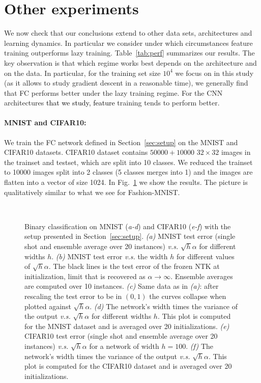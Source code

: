 \documentclass{article}
\newcommand{\mm}[1]{\textcolor{black}{#1}}
\newcommand{\sref}[1]{Section~\ref{#1}}
\newcommand{\fref}[1]{Fig.~\ref{#1}}
\begin{document}
\section{Other experiments}
\label{sec:other_setups}

We now check that our conclusions extend to other data sets, architectures and learning dynamics. In particular we consider under which circumstances feature training outperforms lazy training.  Table~\ref{tab:perf} summarizes our results. The key observation is that which regime works best depends on the architecture and on the data. In particular, for the training set size $10^4$ we focus on in this study (as it allows to study gradient descent in a reasonable time), we generally find that FC performs better under the lazy training regime. For the CNN architectures \mm{that we study, feature} training tends to perform better.   

\paragraph{MNIST and CIFAR10:} We train the FC network defined in \sref{sec:setup} on the MNIST and CIFAR10 datasets. CIFAR10 dataset contains $50000+10000$ $32\times32$ images in the trainset and testset, which are split into 10 classes. We reduced the trainset to 10000 images split into 2 classes (5 classes merges into 1) and the images are flatten into a vector of size 1024. In \fref{fig:mnistcifar} we show the results. The picture is qualitatively similar to what we see for Fashion-MNIST.

\begin{figure}[th!]
    \centering
    \\
    \caption{\label{fig:mnistcifar}Binary classification on MNIST (\emph{a-d}) and CIFAR10 (\emph{e-f}) with the setup presented in \sref{sec:setup}. \emph{(a)} MNIST test error (single shot and ensemble average over 20 instances) \textit{v.s.} $\sqrt{h} \alpha$ for different widths $h$. \emph{(b)} MNIST test error \textit{v.s.} the width $h$ for different values of $\sqrt{h} \alpha$. The black lines is the test error of the frozen NTK at initialization, limit that is recovered as $\alpha \to \infty$. Ensemble averages are computed over 10 instances. \emph{(c)} Same data as in \emph{(a)}: after rescaling the test error to be in $(0,1)$ the curves collapse when plotted against $\sqrt{h}\alpha$. \emph{(d)} The network's width times the variance of the output \textit{v.s.} $\sqrt{h} \alpha$ for different widths $h$. This plot is computed for the MNIST dataset and is averaged over 20 initializations. \emph{(e)} CIFAR10 test error (single shot and ensemble average over 20 instances) \textit{v.s.} $\sqrt{h} \alpha$ for a network of width $h=100$. \emph{(f)} The network's width times the variance of the output \textit{v.s.} $\sqrt{h} \alpha$. This plot is computed for the CIFAR10 dataset and is averaged over 20 initializations.}
\end{figure}
\end{document}
